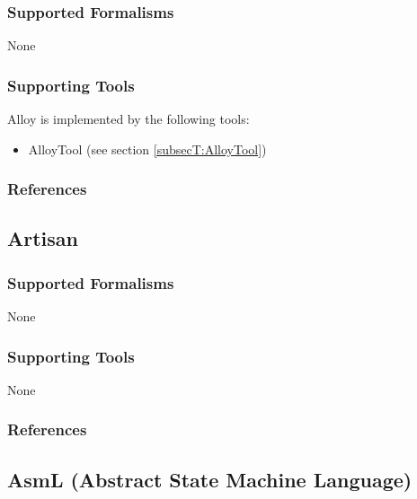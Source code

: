\subsubsection{Supported Formalisms}

None


\subsubsection{Supporting Tools}

Alloy is implemented by the following tools:
\begin{itemize}
	\item AlloyTool (see section \ref{subsecT:AlloyTool})
\end{itemize}


\subsubsection{References}





\subsection{Artisan}
\label{subsecL:Artisan}




\subsubsection{Supported Formalisms}

None


\subsubsection{Supporting Tools}

None


\subsubsection{References}





\subsection{AsmL (Abstract State Machine Language)}
\label{subsecL:AsmL}

